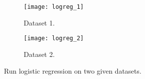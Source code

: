 \begin{answer}
\begin{figure}[H]
	\centering
	\begin{subfigure}[H]{0.45\linewidth}
		\texttt{[image: logreg\_1]}
		\caption{Dataset 1.}
	\end{subfigure}
	\begin{subfigure}[H]{0.45\linewidth}
		\texttt{[image: logreg\_2]}
		\caption{Dataset 2.}
	\end{subfigure}
	\caption{Run logistic regression on two given datasets.}
\end{figure}
\end{answer}

